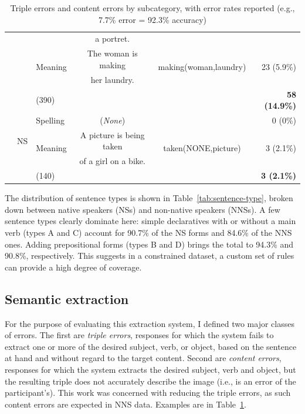 \begin{table}[htb!]
\begin{center}
\begin{tabular}{|l|l|l|cc|r|}
   & & & a portret. & & \\
\cline{3-6}
  & & \multirow{2}{*}{Meaning} & The woman is making & \multirow{2}{*}{making(woman,laundry)} & \multirow{2}{*}{23 (5.9\%)} \\
& & & her laundry. & & \\
\cline{3-6}
  & & (390) & & & \textbf{58 (14.9\%)} \\
 \cline{2-6}
 & \multirow{3}{*}{\begin{sideways}NS\end{sideways}} & Spelling & (\textit{None}) & & 0 (0\%) \\
 \cline{3-6}
 & & \multirow{2}{*}{Meaning} & A picture is being taken & \multirow{2}{*}{taken(NONE,picture)} & \multirow{2}{*}{3 (2.1\%)} \\
  & & & of a girl on a bike. & & \\

 \cline{3-6}
 & & (140) & & & \textbf{3 (2.1\%)} \\
 \hline
\end{tabular}
\end{center}
\caption{Triple errors and content errors by subcategory, with error
  rates reported (e.g., 7.7\% error = 92.3\% accuracy)}
\label{tab:error-types}
\end{table}

The distribution of
sentence types is shown in Table~\ref{tab:sentence-type}, broken down
between native speakers (NSs) and non-native speakers (NNSs).  A few
sentence types clearly dominate here: simple
declaratives with or without a main verb (types A and C) account for
90.7\% of the NS forms and 84.6\% of the NNS ones.
Adding prepositional forms (types B and D) brings the
total to 94.3\% and 90.8\%, respectively. This suggests in a constrained dataset, a custom set of rules can provide a high degree of coverage. 

\subsection{Semantic extraction}
\label{sec:eval:extraction}

For the purpose of evaluating this extraction system, I defined two
major classes of errors. The first are \textit{triple errors},
responses for which the system fails to extract one or more of the
desired subject, verb, or object, based on the sentence at hand and
without regard to the target content. Second are \textit{content
  errors}, responses for which the system extracts the desired
subject, verb and object, but the resulting triple does not accurately
describe the image (i.e., is an error of the participant's). This work 
was concerned with reducing the triple errors, as such content errors 
are expected in NNS data.  Examples are in
Table~\ref{tab:error-types}.


